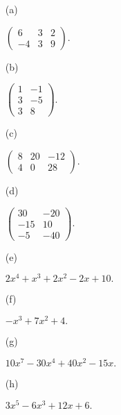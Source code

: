 \begin{Exercise}
	\begin{enumerate}[(a)]
		\item [(a)]
		\begin{answer}
			$
			\begin{pmatrix}
			6 & 3 & 2 \\
			-4 & 3 & 9
			\end{pmatrix}.
			$
		\end{answer}
		
		\item [(b)]
		\begin{answer}
			$
			\begin{pmatrix}
			1 & -1 \\
			3 & -5 \\
			3 & 8
			\end{pmatrix}.
			$
		\end{answer}
		
		\item [(c)]
		\begin{answer}
			$
			\begin{pmatrix}
			8 & 20 & -12 \\
			4 & 0 & 28
			\end{pmatrix}.
			$
		\end{answer}
		
		\item [(d)]
		\begin{answer}
			$
			\begin{pmatrix}
			30 & -20 \\
			-15 & 10 \\
			-5 & -40
			\end{pmatrix}.
			$
		\end{answer}
		
		\item [(e)]
		\begin{answer}
			$
			2x^4+x^3+2x^2-2x+10.
			$
		\end{answer}
		
		\item [(f)]
		\begin{answer}
			$
			-x^3+7x^2+4.
			$
		\end{answer}
		
		\item [(g)]
		\begin{answer}
			$
			10x^7-30x^4+40x^2-15x.
			$
		\end{answer}
		
		\item [(h)]
		\begin{answer}
			$
			3x^5-6x^3+12x+6.
			$
		\end{answer}
	\end{enumerate}
\end{Exercise}